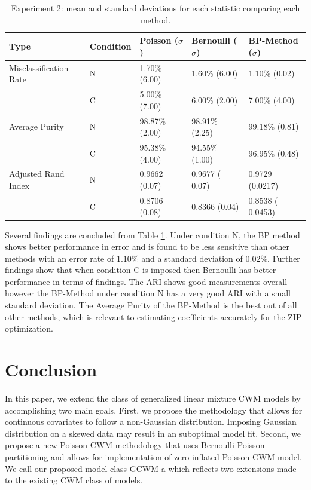 \documentclass[11pt,letterpaper]{article}
\numberwithin{equation}{section}
\numberwithin{equation}{section}
\numberwithin{equation}{section}
\begin{document}
\begin{table}[!htb]
\begin{center}
\caption{Experiment 2: mean and standard deviations for each statistic comparing each method.}
\label{table:exper2}
\begin{tabular}{lllll}
\hline\hline
Type   & Condition & Poisson  ($\sigma $) & Bernoulli  ($ \sigma $) & BP-Method ($ \sigma $) \\
\hline
Misclassification Rate& N         & 1.70\%  (6.00)       & 1.60\% (6.00)         & 1.10\% (0.02)         \\
       & C         & 5.00\%  (7.00)       & 6.00\% (2.00)         & 7.00\% (4.00)         \\
Average Purity & N         & 98.87\% (2.00)    & 98.91\% (2.25)      & 99.18\% (0.81)     \\
       & C         & 95.38\% (4.00)    & 94.55\% (1.00)      & 96.95\% (0.48)      \\
Adjusted Rand Index  & N         & 0.9662 (0.07)    & 0.9677  ( 0.07)     & 0.9729 (0.0217)      \\
       & C         & 0.8706 (0.08)    & 0.8366 (0.04)      & 0.8538 ( 0.0453) \\
       \hline\hline
\end{tabular}
\end{center}
\end{table}
Several findings are concluded from Table \ref{table:exper2}. Under condition N, the BP method shows better performance in error and is found to be less sensitive than other methods with an error rate of $ 1.10 \% $ and a standard deviation of $ 0.02 \% $.  Further findings show that when condition C is imposed then Bernoulli has better performance in terms of findings. The ARI shows good measurements overall however the BP-Method under condition N has a very good ARI with a small standard deviation. The Average Purity of the BP-Method is the best out of all other methods, which is relevant to estimating coefficients accurately for the ZIP optimization.

\section{Conclusion}

In this paper, we extend the class of generalized linear mixture CWM models by accomplishing two main goals. First, we propose the methodology that allows for continuous covariates to follow a non-Gaussian distribution. Imposing Gaussian distribution on a skewed data may result in an suboptimal model fit. Second, we propose a new Poisson CWM methodology that uses Bernoulli-Poisson partitioning and allows for implementation of zero-inflated Poisson CWM model. We call our proposed model class GCWM a which reflects two extensions made to the existing CWM class of models.
\end{document}
